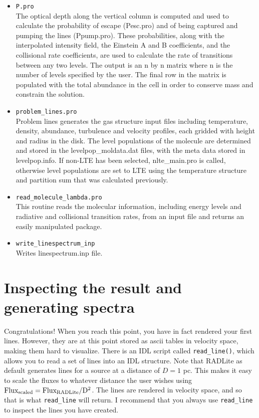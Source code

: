 \documentclass[11pt]{article}
\begin{document}
\begin{itemize}
\item{\tt P.pro}\\
The optical depth along the vertical column is computed and used to calculate the probability of escape (Pesc.pro) and of being captured and pumping the lines (Ppump.pro).  These probabilities, along with the interpolated intensity field, the Einstein A and B coefficients, and the collisional rate coefficients, are used to calculate the rate of transitions between any two levels.  The output is an n by n matrix where n is the number of levels specified by the user.  The final row in the matrix is populated with the total abundance in the cell in order to conserve mass and constrain the solution.

\item {\tt problem\_lines.pro}\\
Problem lines generates the gas structure input files including temperature, density, abundance, turbulence and velocity profiles, each gridded with height and radius in the disk.  The level populations of the molecule are determined and stored in the levelpop\_moldata.dat files, with the meta data stored in levelpop.info.  If non-LTE has been selected, nlte\_main.pro is called, otherwise level populations are set to LTE using the temperature structure and partition sum that was calculated previously.

\item{\tt read\_molecule\_lambda.pro}\\
This routine reads the molecular information, including energy levels and radiative and collisional transition rates, from an input file and returns an easily manipulated package.

\item {\tt write\_linespectrum\_inp}\\
Writes linespectrum.inp file.
 
\end{itemize}

\section{Inspecting the result and generating spectra}

Congratulations! When you reach this point, you have in fact rendered your first lines. However, they are at this point stored as ascii tables in
velocity space, making them hard to visualize. There is an IDL script called {\tt read\_line()}, which allows you to read a 
set of lines into an IDL structure. Note that RADLite as default generates lines for a source at a distance of $D=1$ pc.
This makes it easy to scale the fluxes to whatever distance the user wishes using $\rm Flux_{scaled} = Flux_{RADLite}/D^2$.
The lines are rendered in velocity space, and so that is what {\tt read\_line} will return. 
I recommend that you always use {\tt read\_line} to inspect the lines you have created. 
\end{document}
